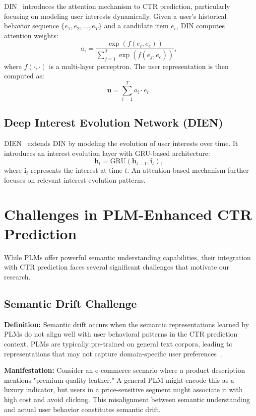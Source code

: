 DIN~\cite{zhou2018deep} introduces the attention mechanism to CTR prediction, particularly focusing on modeling user interests dynamically. Given a user's historical behavior sequence $\{e_1, e_2, \ldots, e_T\}$ and a candidate item $e_c$, DIN computes attention weights:
\[
a_i = \frac{\exp(f(e_i, e_c))}{\sum_{j=1}^{T} \exp(f(e_j, e_c))},
\]
where $f(\cdot, \cdot)$ is a multi-layer perceptron. The user representation is then computed as:
\[
\mathbf{u} = \sum_{i=1}^{T} a_i \cdot e_i.
\]

\subsection{Deep Interest Evolution Network (DIEN)}

DIEN~\cite{zhou2019deep} extends DIN by modeling the evolution of user interests over time. It introduces an interest evolution layer with GRU-based architecture:
\[
\mathbf{h}_t = \text{GRU}(\mathbf{h}_{t-1}, \mathbf{i}_t),
\]
where $\mathbf{i}_t$ represents the interest at time $t$. An attention-based mechanism further focuses on relevant interest evolution patterns.

\section{Challenges in PLM-Enhanced CTR Prediction}

While PLMs offer powerful semantic understanding capabilities, their integration with CTR prediction faces several significant challenges that motivate our research.

\subsection{Semantic Drift Challenge}

\textbf{Definition:} Semantic drift occurs when the semantic representations learned by PLMs do not align well with user behavioral patterns in the CTR prediction context. PLMs are typically pre-trained on general text corpora, leading to representations that may not capture domain-specific user preferences~\cite{wang2023bert4ctr}.

\textbf{Manifestation:} Consider an e-commerce scenario where a product description mentions "premium quality leather." A general PLM might encode this as a luxury indicator, but users in a price-sensitive segment might associate it with high cost and avoid clicking. This misalignment between semantic understanding and actual user behavior constitutes semantic drift.

